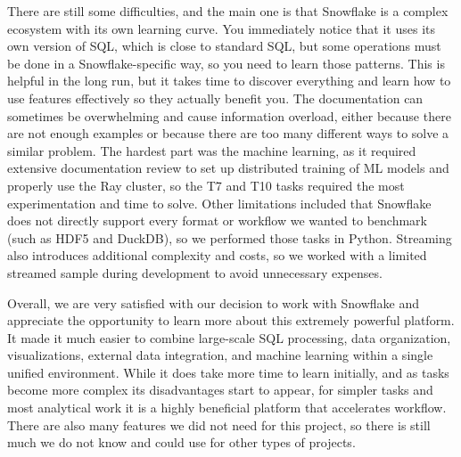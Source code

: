 \documentclass[fleqn,moreauthors,9pt]{ds_report}
\begin{document}
There are still some difficulties, and the main one is that Snowflake is a complex ecosystem with its own learning curve. You immediately notice that it uses its own version of SQL, which is close to standard SQL, but some operations must be done in a Snowflake-specific way, so you need to learn those patterns. This is helpful in the long run, but it takes time to discover everything and learn how to use features effectively so they actually benefit you. The documentation can sometimes be overwhelming and cause information overload, either because there are not enough examples or because there are too many different ways to solve a similar problem. The hardest part was the machine learning, as it required extensive documentation review to set up distributed training of ML models and properly use the Ray cluster, so the T7 and T10 tasks required the most experimentation and time to solve. Other limitations included that Snowflake does not directly support every format or workflow we wanted to benchmark (such as HDF5 and DuckDB), so we performed those tasks in Python. Streaming also introduces additional complexity and costs, so we worked with a limited streamed sample during development to avoid unnecessary expenses. 

Overall, we are very satisfied with our decision to work with Snowflake and appreciate the opportunity to learn more about this extremely powerful platform. It made it much easier to combine large-scale SQL processing, data organization, visualizations, external data integration, and machine learning within a single unified environment. While it does take more time to learn initially, and as tasks become more complex its disadvantages start to appear, for simpler tasks and most analytical work it is a highly beneficial platform that accelerates workflow. There are also many features we did not need for this project, so there is still much we do not know and could use for other types of projects.


\printbibliography
\end{document}
